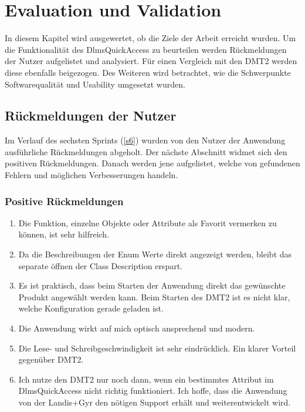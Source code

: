 
\chapter{Evaluation und Validation}\label{eval}
In diesem Kapitel wird ausgewertet, ob die Ziele der Arbeit erreicht wurden.
Um die Funktionalität des DlmsQuickAccess zu beurteilen werden Rückmeldungen der Nutzer aufgelistet und analysiert.
Für einen Vergleich mit den \ac{DMT2} werden diese ebenfalls beigezogen.
Des Weiteren wird betrachtet, wie die Schwerpunkte Softwarequalität und Usability umgesetzt wurden.



\section{Rückmeldungen der Nutzer}\label{feedback}
Im Verlauf des sechsten Sprints (\ref{s6}) wurden von den Nutzer der Anwendung ausführliche Rückmeldungen abgeholt.
Der nächste Abschnitt widmet sich den positiven Rückmeldungen.
Danach werden jene aufgelistet, welche von gefundenen Fehlern und möglichen Verbesserungen handeln.
\subsection{Positive Rückmeldungen}

\begin{enumerate}
   \item Die Funktion, einzelne Objekte oder Attribute als Favorit vermerken zu können, ist sehr hilfreich.
   \item Da die Beschreibungen der Enum Werte direkt angezeigt werden, bleibt das separate öffnen der Class Description erspart.
   \item Es ist praktisch, dass beim Starten der Anwendung direkt das gewünschte Produkt angewählt werden kann. Beim Starten des \ac{DMT2} ist es nicht klar, welche Konfiguration gerade geladen ist.
   \item Die Anwendung wirkt auf mich optisch ansprechend und modern.
   \item Die Lese- und Schreibgeschwindigkeit ist sehr eindrücklich. Ein klarer Vorteil gegenüber \ac{DMT2}.
   \item Ich nutze den \ac{DMT2} nur noch dann, wenn ein bestimmtes Attribut im DlmsQuickAccess nicht richtig funktioniert. Ich hoffe, dass die Anwendung von der Landis+Gyr den nötigen Support erhält und weiterentwickelt wird.
\end{enumerate}


